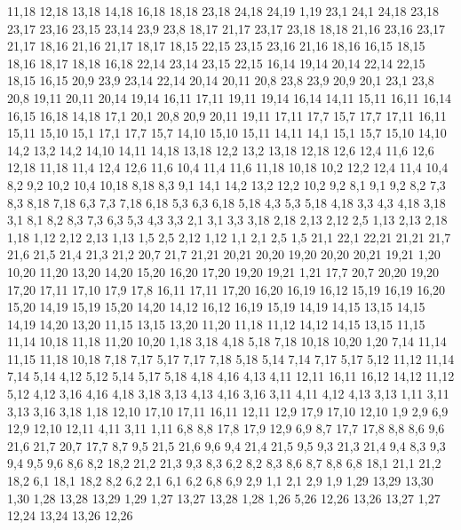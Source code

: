 11,18
12,18
13,18
14,18
16,18
18,18
23,18
24,18
24,19
1,19
%
23,1
24,1
24,18
23,18
23,17
23,16
23,15
23,14
23,9
23,8
%
18,17
21,17
23,17
23,18
18,18
%
21,16
23,16
23,17
21,17
%
18,16
21,16
21,17
18,17
%
18,15
22,15
23,15
23,16
21,16
18,16
%
16,15
18,15
18,16
18,17
18,18
16,18
%
22,14
23,14
23,15
22,15
%
16,14
19,14
20,14
22,14
22,15
18,15
16,15
%
20,9
23,9
23,14
22,14
20,14
20,11
%
20,8
23,8
23,9
20,9
%
20,1
23,1
23,8
20,8
%
19,11
20,11
20,14
19,14
%
16,11
17,11
19,11
19,14
16,14
%
14,11
15,11
16,11
16,14
16,15
16,18
14,18
%
17,1
20,1
20,8
20,9
20,11
19,11
17,11
17,7
%
15,7
17,7
17,11
16,11
15,11
15,10
%
15,1
17,1
17,7
15,7
%
14,10
15,10
15,11
14,11
%
14,1
15,1
15,7
15,10
14,10
14,2
%
13,2
14,2
14,10
14,11
14,18
13,18
%
12,2
13,2
13,18
12,18
12,6
12,4
%
11,6
12,6
12,18
11,18
%
11,4
12,4
12,6
11,6
%
10,4
11,4
11,6
11,18
10,18
%
10,2
12,2
12,4
11,4
10,4
%
8,2
9,2
10,2
10,4
10,18
8,18
8,3
%
9,1
14,1
14,2
13,2
12,2
10,2
9,2
%
8,1
9,1
9,2
8,2
%
7,3
8,3
8,18
7,18
%
6,3
7,3
7,18
6,18
%
5,3
6,3
6,18
5,18
%
4,3
5,3
5,18
4,18
%
3,3
4,3
4,18
3,18
%
3,1
8,1
8,2
8,3
7,3
6,3
5,3
4,3
3,3
%
2,1
3,1
3,3
3,18
2,18
2,13
2,12
2,5
%
1,13
2,13
2,18
1,18
%
1,12
2,12
2,13
1,13
%
1,5
2,5
2,12
1,12
%
1,1
2,1
2,5
1,5
21,1
22,1
22,21
21,21
21,7
21,6
21,5
21,4
21,3
21,2
%
20,7
21,7
21,21
20,21
20,20
%
19,20
20,20
20,21
19,21
%
1,20
10,20
11,20
13,20
14,20
15,20
16,20
17,20
19,20
19,21
1,21
%
17,7
20,7
20,20
19,20
17,20
17,11
17,10
17,9
17,8
%
16,11
17,11
17,20
16,20
16,19
16,12
%
15,19
16,19
16,20
15,20
%
14,19
15,19
15,20
14,20
%
14,12
16,12
16,19
15,19
14,19
14,15
%
13,15
14,15
14,19
14,20
13,20
%
11,15
13,15
13,20
11,20
11,18
%
11,12
14,12
14,15
13,15
11,15
11,14
%
10,18
11,18
11,20
10,20
%
1,18
3,18
4,18
5,18
7,18
10,18
10,20
1,20
%
7,14
11,14
11,15
11,18
10,18
7,18
7,17
%
5,17
7,17
7,18
5,18
%
5,14
7,14
7,17
5,17
%
5,12
11,12
11,14
7,14
5,14
%
4,12
5,12
5,14
5,17
5,18
4,18
4,16
4,13
%
4,11
12,11
16,11
16,12
14,12
11,12
5,12
4,12
%
3,16
4,16
4,18
3,18
%
3,13
4,13
4,16
3,16
%
3,11
4,11
4,12
4,13
3,13
%
1,11
3,11
3,13
3,16
3,18
1,18
%
12,10
17,10
17,11
16,11
12,11
%
12,9
17,9
17,10
12,10
%
1,9
2,9
6,9
12,9
12,10
12,11
4,11
3,11
1,11
%
6,8
8,8
17,8
17,9
12,9
6,9
%
8,7
17,7
17,8
8,8
%
8,6
9,6
21,6
21,7
20,7
17,7
8,7
%
9,5
21,5
21,6
9,6
%
9,4
21,4
21,5
9,5
%
9,3
21,3
21,4
9,4
%
8,3
9,3
9,4
9,5
9,6
8,6
%
8,2
18,2
21,2
21,3
9,3
8,3
%
6,2
8,2
8,3
8,6
8,7
8,8
6,8
%
18,1
21,1
21,2
18,2
%
6,1
18,1
18,2
8,2
6,2
%
2,1
6,1
6,2
6,8
6,9
2,9
%
1,1
2,1
2,9
1,9
1,29
13,29
13,30
1,30
%
1,28
13,28
13,29
1,29
%
1,27
13,27
13,28
1,28
%
1,26
5,26
12,26
13,26
13,27
1,27
%
12,24
13,24
13,26
12,26

